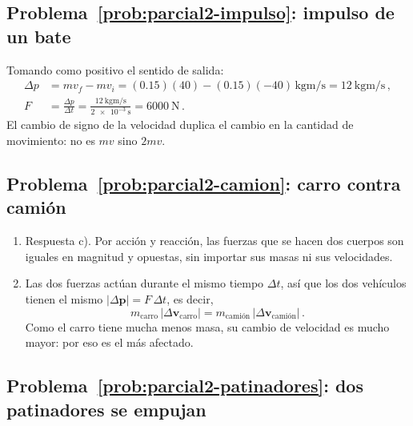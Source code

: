 \documentclass[11pt,a4paper]{book}
\begin{document}
\subsection*{Problema~\ref{prob:parcial2-impulso}: impulso de un bate}
\label{sol:parcial2-impulso}

Tomando como positivo el sentido de salida:
\begin{align}
    \Delta p &= m v_f - m v_i = (0.15)(40) - (0.15)(-40)\,\si{\kilogram\meter\per\second}
              = \SI{12}{\kilogram\meter\per\second}\,, \nonumber\\
    F &= \frac{\Delta p}{\Delta t}
       = \frac{\SI{12}{\kilogram\meter\per\second}}{\SI{2e-3}{\second}}
       = \SI{6000}{\newton}\,.
\end{align}
El cambio de signo de la velocidad duplica el cambio en la cantidad de
movimiento: no es $mv$ sino $2mv$.

\subsection*{Problema~\ref{prob:parcial2-camion}: carro contra camión}
\label{sol:parcial2-camion}

\begin{enumerate}[label=(\Roman*)]
    \item Respuesta c). Por acción y reacción, las fuerzas que se hacen dos
    cuerpos son iguales en magnitud y opuestas, sin importar sus masas ni sus
    velocidades.
    \item Las dos fuerzas actúan durante el mismo tiempo $\Delta t$, así que
    los dos vehículos tienen el mismo
    $\lvert\Delta\boldsymbol{p}\rvert = F\,\Delta t$, es decir,
    \begin{equation}
        m_{\text{carro}}\,\lvert\Delta\boldsymbol{v}_{\text{carro}}\rvert
        = m_{\text{camión}}\,\lvert\Delta\boldsymbol{v}_{\text{camión}}\rvert\,.
    \end{equation}
    Como el carro tiene mucha menos masa, su cambio de velocidad es mucho
    mayor: por eso es el más afectado.
\end{enumerate}

\subsection*{Problema~\ref{prob:parcial2-patinadores}: dos patinadores se empujan}
\label{sol:parcial2-patinadores}
\end{document}
